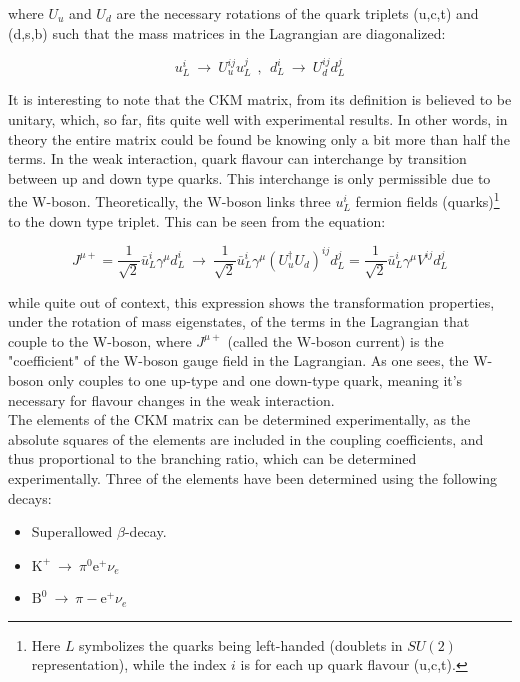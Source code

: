 \documentclass[11pt,a4paper]{article}
\begin{document}
where $U_u$ and $U_d$ are the necessary rotations of the quark triplets (u,c,t) and (d,s,b) such that the mass matrices in the Lagrangian are diagonalized:

\begin{equation}
u_L^i \:\rightarrow\: U_u^{ij} u_L^j \:\:,\:\:
d_L^i \:\rightarrow\: U_d^{ij} d_L^j
\end{equation}

It is interesting to note that the CKM matrix, from its definition is believed to be unitary, which, so far, fits quite well with experimental results. In other words, in theory the entire matrix could be found be knowing only a bit more than half the terms. In the weak interaction, quark flavour can interchange by transition between up and down type quarks. This interchange is only permissible due to the W-boson. Theoretically, the W-boson links three $u_L^i$ fermion fields (quarks)\footnote{Here $L$ symbolizes the quarks being left-handed (doublets in $SU(2)$ representation), while the index $i$ is for each up quark flavour (u,c,t).} to the down type triplet. This can be seen from the equation:

\begin{equation}
J^{\mu+} = \frac{1}{\sqrt{2}}\bar{u}_L^i\gamma^\mu d_L^i \:\rightarrow\: \frac{1}{\sqrt{2}}\bar{u}_L^i\gamma^\mu (U_u^\dagger U_d)^{ij}d_L^j = 
\frac{1}{\sqrt{2}}\bar{u}_L^i\gamma^\mu V^{ij}d_L^j
\end{equation}

while quite out of context, this expression shows the transformation properties, under the rotation of mass eigenstates, of the terms in the Lagrangian that couple to the W-boson, where $J^{\mu+}$ (called the W-boson current) is the "coefficient" of the W-boson gauge field in the Lagrangian. As one sees, the W-boson only couples to one up-type and one down-type quark, meaning it's necessary for flavour changes in the weak interaction.\\

The elements of the CKM matrix can be determined experimentally, as the absolute squares of the elements are included in the coupling coefficients, and thus proportional to the branching ratio, which can be determined experimentally. Three of the elements have been determined using the following decays:

\begin{itemize}\centering
	\item Superallowed $\beta$-decay.
	\item $\text{K}^+ \:\rightarrow\: \pi^0\text{e}^+\nu_e$\\
	\item $\text{B}^0 \:\rightarrow\: \pi-\text{e}^+\nu_e$
\end{itemize}
\end{document}
